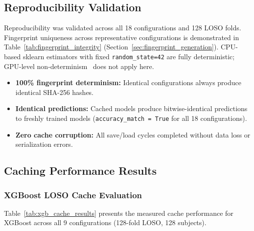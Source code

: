 \subsection{Reproducibility Validation}
\label{sec:results_reproducibility}

Reproducibility was validated across all 18 configurations and 128 LOSO folds.
Fingerprint uniqueness across representative configurations is demonstrated in
Table~\ref{tab:fingerprint_integrity} (Section~\ref{sec:fingerprint_generation}).
CPU-based sklearn estimators with fixed \texttt{random\_state=42} are fully
deterministic; GPU-level non-determinism~\cite{nvidia2024cudnn} does not apply here.

\begin{itemize}
\item \textbf{100\% fingerprint determinism:} Identical configurations always
 produce identical SHA-256 hashes.
\item \textbf{Identical predictions:} Cached models produce bitwise-identical
 predictions to freshly trained models (\texttt{accuracy\_match = True}
 for all 18 configurations).
\item \textbf{Zero cache corruption:} All save/load cycles completed without
 data loss or serialization errors.
\end{itemize}

\subsection{Caching Performance Results}
\label{sec:results_caching}

\subsubsection{XGBoost LOSO Cache Evaluation}

Table~\ref{tab:xgb_cache_results} presents the measured cache performance for
XGBoost across all 9 configurations (128-fold LOSO, 128 subjects).


